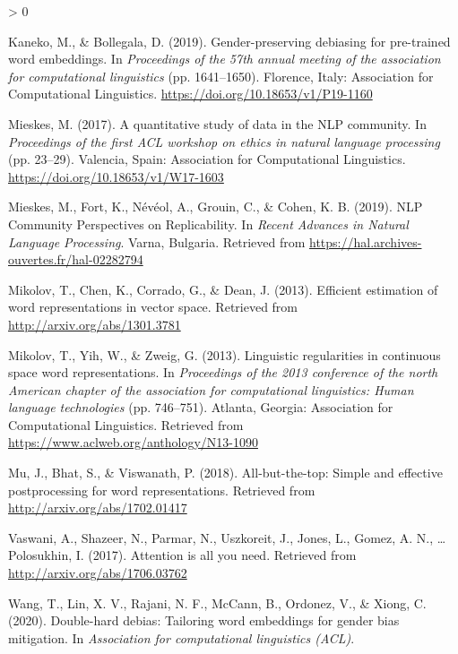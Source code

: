 \documentclass[
  english,
  man,floatsintext]{apa6}
\newlength{\cslhangindent}
\newenvironment{CSLReferences}[2] %
 {%
  \setlength{\parindent}{0pt}
  \ifodd #1 \everypar{\setlength{\hangindent}{\cslhangindent}}\ignorespaces\fi
  \ifnum #2 > 0
  \setlength{\parskip}{#2\baselineskip}
  \fi
 }%
 {}
\begin{document}
\begin{CSLReferences}{1}{0}
\leavevmode\hypertarget{ref-kaneko_2019}{}%
Kaneko, M., \& Bollegala, D. (2019). Gender-preserving debiasing for pre-trained word embeddings. In \emph{Proceedings of the 57th annual meeting of the association for computational linguistics} (pp. 1641--1650). Florence, Italy: Association for Computational Linguistics. \url{https://doi.org/10.18653/v1/P19-1160}

\leavevmode\hypertarget{ref-mieskes_2017}{}%
Mieskes, M. (2017). A quantitative study of data in the {NLP} community. In \emph{Proceedings of the first {ACL} workshop on ethics in natural language processing} (pp. 23--29). Valencia, Spain: Association for Computational Linguistics. \url{https://doi.org/10.18653/v1/W17-1603}

\leavevmode\hypertarget{ref-mieskes_2019}{}%
Mieskes, M., Fort, K., Névéol, A., Grouin, C., \& Cohen, K. B. (2019). {NLP Community Perspectives on Replicability.} In \emph{{Recent Advances in Natural Language Processing}}. Varna, Bulgaria. Retrieved from \url{https://hal.archives-ouvertes.fr/hal-02282794}

\leavevmode\hypertarget{ref-mikolov2013Google}{}%
Mikolov, T., Chen, K., Corrado, G., \& Dean, J. (2013). Efficient estimation of word representations in vector space. Retrieved from \url{http://arxiv.org/abs/1301.3781}

\leavevmode\hypertarget{ref-mikolov2013MSR}{}%
Mikolov, T., Yih, W., \& Zweig, G. (2013). Linguistic regularities in continuous space word representations. In \emph{Proceedings of the 2013 conference of the north {A}merican chapter of the association for computational linguistics: Human language technologies} (pp. 746--751). Atlanta, Georgia: Association for Computational Linguistics. Retrieved from \url{https://www.aclweb.org/anthology/N13-1090}

\leavevmode\hypertarget{ref-mu_2018}{}%
Mu, J., Bhat, S., \& Viswanath, P. (2018). All-but-the-top: Simple and effective postprocessing for word representations. Retrieved from \url{http://arxiv.org/abs/1702.01417}

\leavevmode\hypertarget{ref-vaswani_2017}{}%
Vaswani, A., Shazeer, N., Parmar, N., Uszkoreit, J., Jones, L., Gomez, A. N., \ldots{} Polosukhin, I. (2017). Attention is all you need. Retrieved from \url{http://arxiv.org/abs/1706.03762}

\leavevmode\hypertarget{ref-wang_2020}{}%
Wang, T., Lin, X. V., Rajani, N. F., McCann, B., Ordonez, V., \& Xiong, C. (2020). Double-hard debias: Tailoring word embeddings for gender bias mitigation. In \emph{Association for computational linguistics (ACL)}.


\end{CSLReferences}
\end{document}
